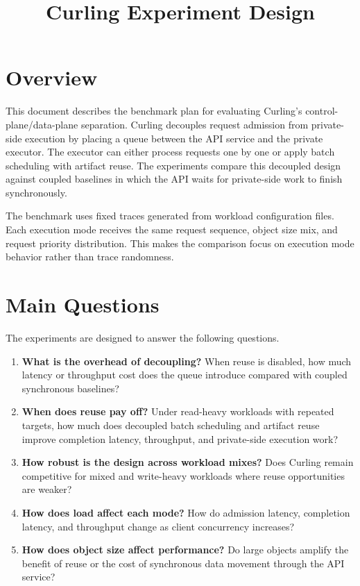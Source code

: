 \documentclass[11pt]{article}
\title{Curling Experiment Design}
\author{}
\date{}
\begin{document}
\maketitle

\section{Overview}

This document describes the benchmark plan for evaluating Curling's
control-plane/data-plane separation.  Curling decouples request admission from
private-side execution by placing a queue between the API service and the
private executor.  The executor can either process requests one by one or apply
batch scheduling with artifact reuse.  The experiments compare this decoupled
design against coupled baselines in which the API waits for private-side work to
finish synchronously.

The benchmark uses fixed traces generated from workload configuration files.
Each execution mode receives the same request sequence, object size mix, and
request priority distribution.  This makes the comparison focus on execution
mode behavior rather than trace randomness.

\section{Main Questions}

The experiments are designed to answer the following questions.

\begin{enumerate}[leftmargin=*]
  \item \textbf{What is the overhead of decoupling?}
  When reuse is disabled, how much latency or throughput cost does the queue
  introduce compared with coupled synchronous baselines?

  \item \textbf{When does reuse pay off?}
  Under read-heavy workloads with repeated targets, how much does decoupled
  batch scheduling and artifact reuse improve completion latency, throughput,
  and private-side execution work?

  \item \textbf{How robust is the design across workload mixes?}
  Does Curling remain competitive for mixed and write-heavy workloads where
  reuse opportunities are weaker?

  \item \textbf{How does load affect each mode?}
  How do admission latency, completion latency, and throughput change as client
  concurrency increases?

  \item \textbf{How does object size affect performance?}
  Do large objects amplify the benefit of reuse or the cost of synchronous data
  movement through the API service?
\end{enumerate}
\end{document}
